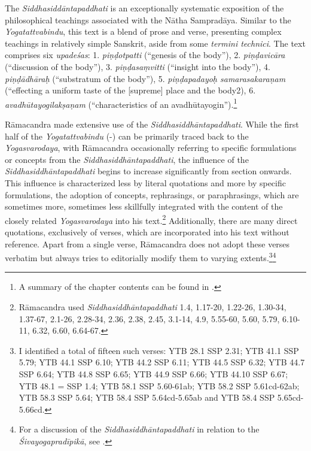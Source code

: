 The \emph{Siddhasiddāntapaddhati} is an exceptionally systematic exposition of the philosophical teachings associated with the Nātha Sampradāya. Similar to the \emph{Yogatattvabindu}, this text is a blend of prose and verse, presenting complex teachings in relatively simple Sanskrit, aside from some \textit{termini technici}. The text comprises six \textit{upadeśas}: 1. \textit{piṇḍotpatti} (``genesis of the body''), 2. \textit{piṇḍavicāra} (``discussion of the body''), 3. \textit{piṇḍasaṃvitti} (``insight into the body''), 4. \textit{piṇḍādhāraḥ} (``substratum of the body''), 5. \textit{piṇḍapadayoḥ samarasakaraṇam} (``effecting a uniform taste of the [supreme] place and the body2), 6. \textit{avadhūtayogilakṣaṇam} (``characteristics of an avadhūtayogin'').\footnote{A summary of the chapter contents can be found in \citeauthor[2016: -]{ssplonavla}.}

Rāmacandra made extensive use of the \emph{Siddhasiddhāntapaddhati}. While the first half of the \emph{Yogatattvabindu} (-) can be primarily traced back to the \emph{Yogasvarodaya}, with Rāmacandra occasionally referring to specific formulations or concepts from the \emph{Siddhasiddhāntapaddhati}, the influence of the \emph{Siddhasiddhāntapaddhati} begins to increase significantly from section  onwards. This influence is characterized less by literal quotations and more by specific formulations, the adoption of concepts, rephrasings, or paraphrasings, which are sometimes more, sometimes less skillfully integrated with the content of the closely related \emph{Yogasvarodaya} into his text.\footnote{Rāmacandra used \emph{Siddhasiddhāntapaddhati} 1.4, 1.17-20, 1.22-26, 1.30-34, 1.37-67, 2.1-26, 2.28-34, 2.36, 2.38, 2.45, 3.1-14, 4.9, 5.55-60, 5.60, 5.79, 6.10-11, 6.32, 6.60, 6.64-67.} Additionally, there are many direct quotations, exclusively of verses, which are incorporated into his text without reference. Apart from a single verse, Rāmacandra does not adopt these verses verbatim but always tries to editorially modify them to varying extents.\footnote{I identified a total of fifteen such verses: YTB 28.1 \approx SSP 2.31; YTB 41.1 \approx SSP 5.79; YTB 44.1 \approx SSP 6.10; YTB 44.2 \approx SSP 6.11; YTB 44.5 \approx SSP 6.32; YTB 44.7 \approx SSP 6.64; YTB 44.8 \approx SSP 6.65; YTB 44.9 \approx SSP 6.66; YTB 44.10 \approx SSP 6.67; YTB 48.1 = SSP 1.4; YTB 58.1 \approx SSP 5.60-61ab; YTB 58.2 \approx SSP 5.61cd-62ab; YTB 58.3 \approx SSP 5.64; YTB 58.4 \approx SSP 5.64cd-5.65ab and YTB 58.4 \approx SSP 5.65cd-5.66cd.}\footnote{For a discussion of the \emph{Siddhasiddhāntapaddhati} in relation to the \emph{Śivayogapradīpikā}, see \citeauthor[20: 147-152]{powell2023}.}

